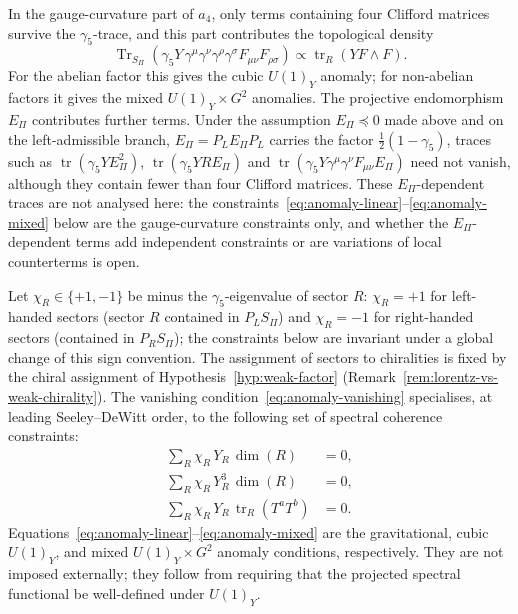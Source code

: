 \documentclass[11pt,a4paper]{article}
\theoremstyle{definition}
\theoremstyle{remark}
\begin{document}
    In the gauge-curvature part of $a_4$, only terms containing four Clifford matrices survive the
    $\gamma_5$-trace, and this part contributes the topological density
    \begin{equation}
      \label{eq:topological-density}
      \operatorname{Tr}_{S_\Pi}\!\left(
                                   \gamma_5 Y \, \gamma^\mu\gamma^\nu\gamma^\rho\gamma^\sigma
                                   F_{\mu\nu} F_{\rho\sigma}
      \right)
      \propto \operatorname{tr}_R(Y F \wedge F).
    \end{equation}
    For the abelian factor this gives the cubic $U(1)_Y$ anomaly; for non-abelian
    factors it gives the mixed $U(1)_Y \times G^2$ anomalies.
    The projective endomorphism $E_\Pi$ contributes further terms.
    Under the assumption $E_\Pi \preceq 0$ made above and on the left-admissible branch, $E_\Pi = P_L E_\Pi P_L$ carries the factor $\tfrac12(1 - \gamma_5)$, traces such as
    $\operatorname{tr}(\gamma_5 Y E_\Pi^2)$, $\operatorname{tr}(\gamma_5 Y R E_\Pi)$ and
    $\operatorname{tr}(\gamma_5 Y \gamma^\mu\gamma^\nu F_{\mu\nu} E_\Pi)$ need not vanish, although they
    contain fewer than four Clifford matrices.
    These $E_\Pi$-dependent traces are not analysed here: the
    constraints~\eqref{eq:anomaly-linear}--\eqref{eq:anomaly-mixed} below are the gauge-curvature
    constraints only, and whether the $E_\Pi$-dependent terms add independent constraints or are
    variations of local counterterms is open.

    Let $\chi_R \in \{+1, -1\}$ be minus the $\gamma_5$-eigenvalue of sector $R$:
    $\chi_R = +1$ for left-handed sectors (sector $R$ contained in $P_L S_\Pi$) and
    $\chi_R = -1$ for right-handed sectors (contained in $P_R S_\Pi$); the constraints below are
    invariant under a global change of this sign convention.
    The assignment of sectors to chiralities is fixed by the chiral
    assignment of Hypothesis~\ref{hyp:weak-factor} (Remark~\ref{rem:lorentz-vs-weak-chirality}).
    The vanishing condition~\eqref{eq:anomaly-vanishing} specialises, at leading
    Seeley--DeWitt order, to the following set of spectral coherence constraints:
    \begin{align}
      \label{eq:anomaly-linear}
      \sum_R \chi_R \, Y_R \, \dim(R) &= 0 , \\
      \label{eq:anomaly-cubic}
      \sum_R \chi_R \, Y_R^3 \, \dim(R) &= 0 , \\
      \label{eq:anomaly-mixed}
      \sum_R \chi_R \, Y_R \, \operatorname{tr}_R(T^a T^b) &= 0 .
    \end{align}
    Equations~\eqref{eq:anomaly-linear}--\eqref{eq:anomaly-mixed} are the
    gravitational, cubic $U(1)_Y$, and mixed $U(1)_Y \times G^2$ anomaly conditions,
    respectively.
    They are not imposed externally; they follow from requiring that the projected
    spectral functional be well-defined under $U(1)_Y$.
\end{document}
